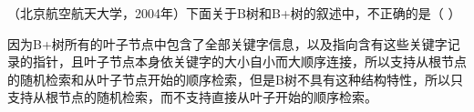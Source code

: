 \question （北京航空航天大学，2004年）下面关于B树和B+树的叙述中，不正确的是（ ）
\par{}
\begin{solution}因为B+树所有的叶子节点中包含了全部关键字信息，以及指向含有这些关键字记录的指针，且叶子节点本身依关键字的大小自小而大顺序连接，所以支持从根节点的随机检索和从叶子节点开始的顺序检索，但是B树不具有这种结构特性，所以只支持从根节点的随机检索，而不支持直接从叶子开始的顺序检索。
\end{solution}
